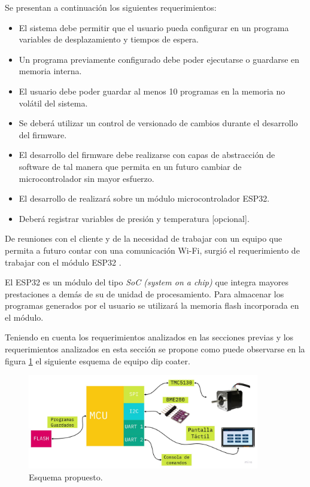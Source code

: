 Se presentan a continuación los siguientes requerimientos:
\begin{itemize}

\item El sistema debe permitir que el usuario pueda configurar en un programa variables de desplazamiento y tiempos de espera.
\item Un programa previamente configurado debe poder ejecutarse o guardarse en memoria interna.
\item El usuario debe poder guardar al menos 10 programas en la memoria no volátil del sistema.
\item Se deberá utilizar un control de versionado de cambios durante el desarrollo del firmware.
\item El desarrollo del firmware debe realizarse con capas de abstracción de software de tal manera que permita en un futuro cambiar de microcontrolador sin mayor esfuerzo.
\item El desarrollo de realizará sobre un módulo microcontrolador ESP32.
\item Deberá registrar variables de presión y temperatura [opcional].
\end{itemize}

De reuniones con el cliente y de la necesidad de trabajar con un equipo que permita a futuro contar con una comunicación Wi-Fi, surgió el requerimiento de trabajar con el módulo ESP32 \citep{web_esp}.
 
El ESP32 es un módulo del tipo \textit{SoC (system on a chip)} que integra mayores prestaciones a demás de su de unidad de procesamiento. Para almacenar los programas generados por el usuario se utilizará la memoria flash incorporada en el módulo.  

Teniendo en cuenta los requerimientos analizados en las secciones previas y los requerimientos analizados en esta sección se propone como puede observarse en la figura \ref{fig:equipo_propuesto} el siguiente esquema de equipo dip coater.  


\begin{figure}[ht]
\centering 
\includegraphics[width=0.9\textwidth]{./Figures/cap2_esquema_propuesto.jpg}
\caption{Esquema propuesto.}
\label{fig:equipo_propuesto}
\end{figure}

